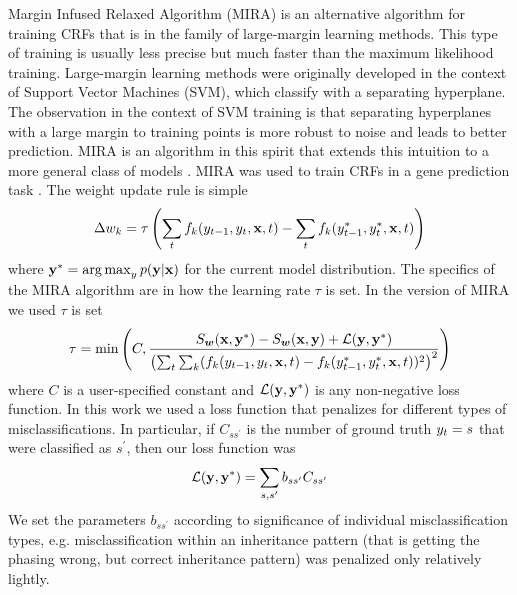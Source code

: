 Margin Infused Relaxed Algorithm (MIRA) is an alternative algorithm for training CRFs that is in the family of large-margin learning methods. This type of training is usually less precise but much faster than the maximum likelihood training. Large-margin learning methods were originally developed in the context of Support Vector Machines (SVM), which classify with a separating hyperplane. The observation in the context of SVM training is that separating hyperplanes with a large margin to training points is more robust to noise and leads to better prediction. MIRA is an algorithm in this spirit that extends this intuition to a more general class of models \citep{crammerThesis}. MIRA was used to train CRFs in a gene prediction task \citep{bernal2007}. The weight update rule is simple
\begin{align*}
\Delta w_k = \tau \left(\sum_{t} f_k(y_{t-1}, y_{t}, \mathbf{x}, t) - \sum_{t} f_k(y^*_{t-1}, y^*_{t}, \mathbf{x}, t)\right)
\end{align*}
where $\mathbf{y}^* = \operatorname*{arg\,max}_{y} p(\mathbf{y}|\mathbf{x})$ for the current model distribution. The specifics of the MIRA algorithm are in how the learning rate $\tau$ is set. In the version of MIRA we used $\tau$ is set
\begin{align*}
\tau = \min\left(C, \frac{S_{\bm{w}}(\mathbf{x}, \mathbf{y}^*) - S_{\bm{w}}(\mathbf{x}, \mathbf{y}) + \mathcal{L}(\mathbf{y}, \mathbf{y}^*)}{\left(\sum_{t} \sum_k (f_k(y_{t-1}, y_{t}, \mathbf{x}, t) - f_k(y^*_{t-1}, y^*_{t}, \mathbf{x}, t))^2 \right)^2}\right)
\end{align*}
where $C$ is a user-specified constant and $\mathcal{L}(\mathbf{y}, \mathbf{y}^*)$ is any non-negative loss function. In this work we used a loss function that penalizes for different types of misclassifications. In particular, if $C_{ss^{\prime}}$ is the number of ground truth $y_{t} = s$ that were classified as $s^{\prime}$, then our loss function was
\begin{align*}
\mathcal{L}(\mathbf{y}, \mathbf{y}^*) = \sum_{s, s^{\prime}} b_{ss^{\prime}} C_{ss^{\prime}}
\end{align*}
We set the parameters $b_{ss^{\prime}}$ according to significance of individual misclassification types, e.g. misclassification within an inheritance pattern (that is getting the phasing wrong, but correct inheritance pattern) was penalized only relatively lightly.


